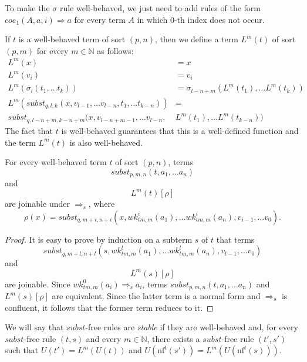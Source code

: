 \documentclass[reqno]{amsart}
\theoremstyle{definition}
\theoremstyle{remark}
\newcommand{\nf}{\mathrm{nf}}
\newcommand{\coe}{\mathit{coe}}
\newcommand{\subst}{\mathit{subst}}
\newcommand{\wk}{\mathit{wk}}
\newcommand{\tm}{\mathit{tm}}
\numberwithin{figure}{section}
\begin{document}
\begin{example}
To make the $\sigma$ rule well-behaved, we just need to add rules of the form $\coe_1(A, a, i) \Rightarrow a$ for every term $A$ in which $0$-th index does not occur.
\end{example}

If $t$ is a well-behaved term of sort $(p,n)$, then we define a term $L^m(t)$ of sort $(p,m)$ for every $m \in \mathbb{N}$ as follows:
\begin{align*}
L^m(x) & = x \\
L^m(v_i) & = v_i \\
L^m(\sigma_l(t_1, \ldots t_k)) & = \sigma_{l-n+m}(L^m(t_1), \ldots L^m(t_k)) \\
L^m(\subst_{q,l,k}(x, v_{l-1}, \ldots v_{l-n}, t_1, \ldots t_{k-n})) & = \\
\subst_{q,l-n+m,k-n+m}(x, v_{l-n+m-1}, \ldots v_{l-n}, & L^m(t_1), \ldots L^m(t_{k-n}))
\end{align*}
The fact that $t$ is well-behaved guarantees that this is a well-defined function and the term $L^m(t)$ is also well-behaved.

\begin{lem}[lift]
For every well-behaved term $t$ of sort $(p,n)$, terms
\[ \subst_{p,m,n}(t, a_1, \ldots a_n) \]
and
\[ L^m(t)[\rho] \]
are joinable under $\Rightarrow_s$, where
\[ \rho(x) = \subst_{q,m+i,n+i}(x, \wk_{\tm,m}^i(a_1), \ldots \wk_{\tm,m}^i(a_n), v_{i-1}, \ldots v_0). \]
\end{lem}
\begin{proof}
It is easy to prove by induction on a subterm $s$ of $t$ that terms
\[ \subst_{q,m+l,n+l}(s, \wk_{\tm,m}^l(a_1), \ldots \wk_{\tm,m}^l(a_n), v_{l-1}, \ldots v_0) \]
and
\[ L^m(s)[\rho] \]
are joinable.
Since $\wk_{\tm,m}^0(a_i) \Rightarrow_s a_i$, terms $\subst_{p,m,n}(t, a_1, \ldots a_n)$ and $L^m(s)[\rho]$ are equivalent.
Since the latter term is a normal form and $\Rightarrow_s$ is confluent, it follows that the former term reduces to it.
\end{proof}

We will say that $\subst$-free rules are \emph{stable} if they are well-behaved and, for every $\subst$-free rule $(t,s)$ and every $m \in \mathbb{N}$,
there exists a $\subst$-free rule $(t',s')$ such that $U(t') = L^m(U(t))$ and $U(\nf^t(s')) = L^m(U(\nf^t(s)))$.
\end{document}
